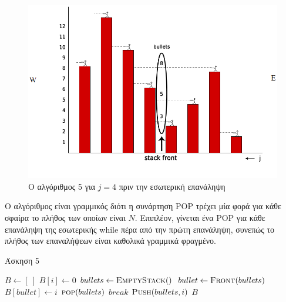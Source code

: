 \documentclass[11pt,a4paper]{book}
\begin{document}
\begin{figure}
	\caption{Ο αλγόριθμος 5 για $j = 4$ πριν την εσωτερική επανάληψη}
	\includegraphics[width=1\textwidth]{5.png}
\end{figure}

Ο αλγόριθμος είναι γραμμικός διότι η συνάρτηση \textlatin{POP} τρέχει μία φορά για κάθε σφαίρα το πλήθος των οποίων είναι $N$. Επιπλέον, γίνεται ένα \textlatin{POP} για κάθε επανάληψη της εσωτερικής \textlatin{while} πέρα από την πρώτη επανάληψη, συνεπώς το πλήθος των επαναλήψεων είναι καθολικά γραμμικά φραγμένο.

\begin{algorithm}[H]
\caption{\textgreek{Άσκηση 5}}
\begin{algorithmic}[1]
    \State $B \gets [\ ]$
   		\State $B[ i ] \gets 0$
   	\EndFor
    \State $bullets \gets \Call{EmptyStack}$
            \State $bullet \gets \Call{Front}{bullets}$
                \State $B[ bullet ] \gets i$
                \State $\Call{pop}{bullets}$
            \Else
                \State $break$
            \EndIf
        \EndWhile
        \State $\Call{Push}{bullets, i}$
    \EndFor
    \State \Return $B$
\EndProcedure
\end{algorithmic}
\end{algorithm}

\end{document}
